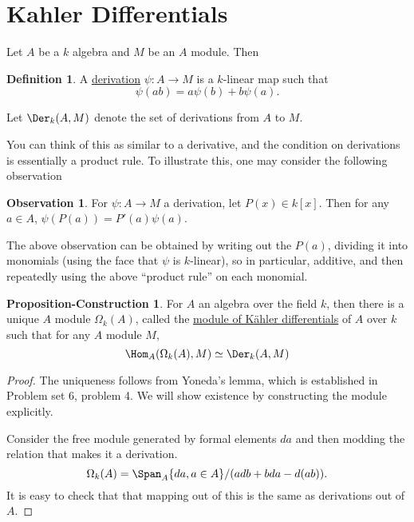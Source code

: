 \documentclass[12 pt]{article}
\theoremstyle{definition}
\newtheorem{propconstr}[thm]{Proposition-Construction}
\newtheorem{defn}[thm]{Definition}
\newtheorem{obs}[thm]{Observation}
\renewcommand{\(}{\left(}
\renewcommand{\)}{\right)}
\begin{document}
\section{Kahler Differentials}

Let $A$ be a $k$ algebra and $M$ be an $A$ module. Then
\begin{defn} A \underline{derivation} $\psi:A \to M$ is a $k$-linear map such that
\[\psi(ab)=a\psi(b)+b\psi(a).\]

Let $\Der_k(A,M)$ denote the set of derivations from $A$ to $M$.
\end{defn}

You can think of this as similar to a derivative, and the condition on derivations is essentially a product rule. To illustrate this, one may consider the following observation

\begin{obs} For $\psi:A \to M$ a derivation, let $P(x) \in k[x]$. Then for any $a \in A$, $\psi(P(a))=P'(a)\psi(a)$.
\end{obs}

The above observation can be obtained by writing out the $P(a)$, dividing it into monomials (using the face that $\psi$ is $k$-linear), so in particular, additive, and then repeatedly using the above ``product rule'' on each monomial.

\begin{propconstr} For $A$ an algebra over the field $k$, then there is a unique $A$ module $\Omega_k(A)$, called the \underline{module of K\"{a}hler differentials} of $A$ over $k$ such that for any $A$ module $M$,
\[\Hom_A(\Omega_k(A), M) \simeq \Der_k(A,M)\]
\label{kahlerdef}
\end{propconstr}
\begin{proof}
The uniqueness follows from Yoneda's lemma, which is established in Problem set 6, problem 4. We will show existence by constructing the module explicitly.

Consider the free module generated by formal elements $da$ and then modding the relation that makes it a derivation.
\[\Omega_k(A)=\Span_A\{da,a \in A\}/(adb+bda-d(ab)).\]
It is easy to check that that mapping out of this is the same as derivations out of $A$.
\end{proof}
\end{document}
